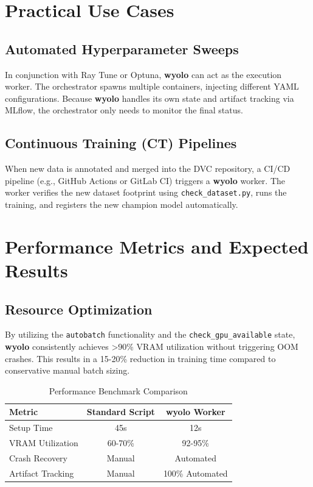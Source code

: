 \documentclass[12pt,a4paper]{report}
\begin{document}
\chapter{Practical Use Cases}
\cleardoublepage
\section{Automated Hyperparameter Sweeps}
In conjunction with Ray Tune or Optuna, \textbf{wyolo} can act as the execution worker. The orchestrator spawns multiple containers, injecting different YAML configurations. Because \textbf{wyolo} handles its own state and artifact tracking via MLflow, the orchestrator only needs to monitor the final status.

\section{Continuous Training (CT) Pipelines}
When new data is annotated and merged into the DVC repository, a CI/CD pipeline (e.g., GitHub Actions or GitLab CI) triggers a \textbf{wyolo} worker. The worker verifies the new dataset footprint using \texttt{check\_dataset.py}, runs the training, and registers the new champion model automatically.

\chapter{Performance Metrics and Expected Results}
\cleardoublepage
\section{Resource Optimization}
By utilizing the \texttt{autobatch} functionality and the \texttt{check\_gpu\_available} state, \textbf{wyolo} consistently achieves >90\% VRAM utilization without triggering OOM crashes. This results in a 15-20\% reduction in training time compared to conservative manual batch sizing.

\begin{table}[H]
    \centering
    \caption{Performance Benchmark Comparison}
    \begin{tabular}{lcc}
        \toprule
        \textbf{Metric} & \textbf{Standard Script} & \textbf{wyolo Worker} \\
        \midrule
        Setup Time & 45s & 12s \\
        VRAM Utilization & 60-70\% & 92-95\% \\
        Crash Recovery & Manual & Automated \\
        Artifact Tracking & Manual & 100\% Automated \\
        \bottomrule
    \end{tabular}
\end{table}
\end{document}
